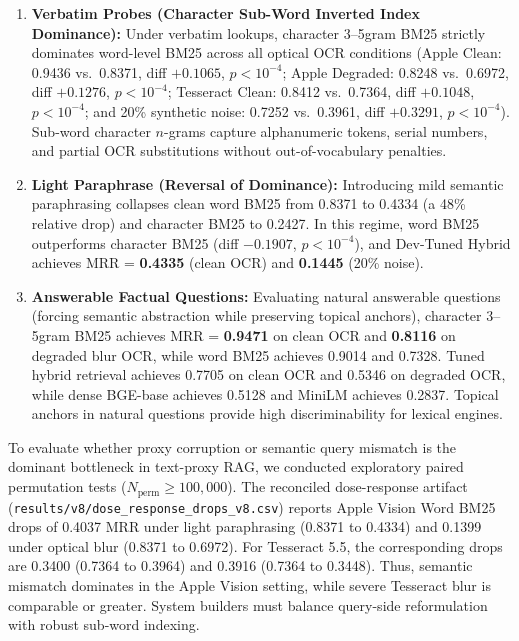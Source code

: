 \documentclass[conference]{IEEEtran}
\begin{document}
\begin{enumerate}
    \setlength{\itemsep}{0.2pt plus 0.1pt}
    \setlength{\parskip}{0pt}
    \item \textbf{Verbatim Probes (Character Sub-Word Inverted Index Dominance):} Under verbatim lookups, character 3--5gram BM25 strictly dominates word-level BM25 across all optical OCR conditions (Apple Clean: 0.9436 vs.\ 0.8371, diff $+0.1065$, $p < 10^{-4}$; Apple Degraded: 0.8248 vs.\ 0.6972, diff $+0.1276$, $p < 10^{-4}$; Tesseract Clean: 0.8412 vs.\ 0.7364, diff $+0.1048$, $p < 10^{-4}$; and 20\% synthetic noise: 0.7252 vs.\ 0.3961, diff $+0.3291$, $p < 10^{-4}$). Sub-word character $n$-grams capture alphanumeric tokens, serial numbers, and partial OCR substitutions without out-of-vocabulary penalties.
    \item \textbf{Light Paraphrase (Reversal of Dominance):} Introducing mild semantic paraphrasing collapses clean word BM25 from 0.8371 to 0.4334 (a 48\% relative drop) and character BM25 to 0.2427. In this regime, word BM25 outperforms character BM25 (diff $-0.1907$, $p < 10^{-4}$), and Dev-Tuned Hybrid achieves MRR = \textbf{0.4335} (clean OCR) and \textbf{0.1445} (20\% noise).
    \item \textbf{Answerable Factual Questions:} Evaluating natural answerable questions (forcing semantic abstraction while preserving topical anchors), character 3--5gram BM25 achieves MRR = \textbf{0.9471} on clean OCR and \textbf{0.8116} on degraded blur OCR, while word BM25 achieves 0.9014 and 0.7328. Tuned hybrid retrieval achieves 0.7705 on clean OCR and 0.5346 on degraded OCR, while dense BGE-base achieves 0.5128 and MiniLM achieves 0.2837. Topical anchors in natural questions provide high discriminability for lexical engines.
\end{enumerate}

To evaluate whether proxy corruption or semantic query mismatch is the dominant bottleneck in text-proxy RAG, we conducted exploratory paired permutation tests ($N_{\text{perm}} \ge 100{,}000$). The reconciled dose-response artifact (\texttt{results/v8/dose\_response\_drops\_v8.csv}) reports Apple Vision Word BM25 drops of 0.4037 MRR under light paraphrasing (0.8371 to 0.4334) and 0.1399 under optical blur (0.8371 to 0.6972). For Tesseract 5.5, the corresponding drops are 0.3400 (0.7364 to 0.3964) and 0.3916 (0.7364 to 0.3448). Thus, semantic mismatch dominates in the Apple Vision setting, while severe Tesseract blur is comparable or greater. System builders must balance query-side reformulation with robust sub-word indexing.
\end{document}
